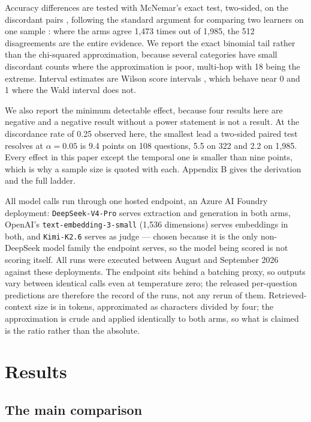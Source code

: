 \documentclass[10pt,a4paper,twocolumn]{article}
\begin{document}
Accuracy differences are tested with McNemar's exact test, two-sided, on the discordant pairs \citep{mcnemar1947}, following the standard argument for comparing two learners on one sample \citep{dietterich1998}: where the arms agree 1,473 times out of 1,985, the 512 disagreements are the entire evidence. We report the exact binomial tail rather than the chi-squared approximation, because several categories have small discordant counts where the approximation is poor, multi-hop with 18 being the extreme. Interval estimates are Wilson score intervals \citep{wilson1927}, which behave near 0 and 1 where the Wald interval does not.

We also report the minimum detectable effect, because four results here are negative and a negative result without a power statement is not a result. At the discordance rate of 0.25 observed here, the smallest lead a two-sided paired test resolves at $\alpha = 0.05$ is 9.4 points on 108 questions, 5.5 on 322 and 2.2 on 1,985. Every effect in this paper except the temporal one is smaller than nine points, which is why a sample size is quoted with each. Appendix B gives the derivation and the full ladder.

All model calls run through one hosted endpoint, an Azure AI Foundry deployment: \texttt{DeepSeek-V4-Pro} serves extraction and generation in both arms, OpenAI's \texttt{text-embedding-3-small} (1,536 dimensions) serves embeddings in both, and \texttt{Kimi-K2.6} serves as judge — chosen because it is the only non-DeepSeek model family the endpoint serves, so the model being scored is not scoring itself. All runs were executed between August and September 2026 against these deployments. The endpoint sits behind a batching proxy, so outputs vary between identical calls even at temperature zero; the released per-question predictions are therefore the record of the runs, not any rerun of them. Retrieved-context size is in tokens, approximated as characters divided by four; the approximation is crude and applied identically to both arms, so what is claimed is the ratio rather than the absolute.

\section{Results}

\subsection{The main comparison}
\end{document}
